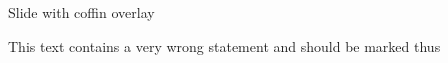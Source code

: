 \documentclass[10pt,aspectratio=1610]{beamer}
\begin{document}
\setcounter{finalframe}{\value{framenumber}}

\appendix

\begin{frame}[fragile]{Slide with coffin overlay}

This text contains a very wrong statement and should be marked thus

\GlobalSetHorizontalCoffin {}
\end{frame}

\setcounter{framenumber}{\value{finalframe}}
\end{document}
